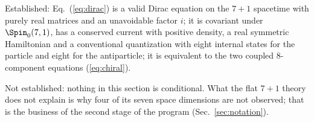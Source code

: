 Established: Eq.~(\ref{eq:dirac}) is a valid Dirac equation on the $7+1$ spacetime with purely real
matrices and an unavoidable factor $i$; it is covariant under $\Spin_0(7,1)$, has a conserved current
with positive density, a real symmetric Hamiltonian and a conventional quantization with eight
internal states for the particle and eight for the antiparticle; it is equivalent to the two coupled
8-component equations (\ref{eq:chiral}).

Not established: nothing in this section is conditional. What the flat $7+1$ theory does not explain
is why four of its seven space dimensions are not observed; that is the business of the second stage
of the program (Sec.~\ref{sec:notation}).
